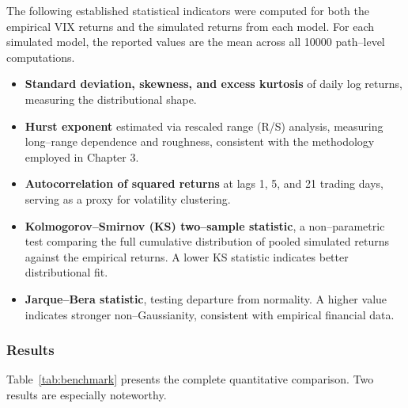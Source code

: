 \documentclass[12pt,a4paper]{report}
\numberwithin{equation}{section}
\begin{document}
The following established statistical indicators were computed for both the empirical VIX returns and the simulated returns from each model. For each simulated model, the reported values are the mean across all 10\hspace{1pt}000 path--level computations.

\begin{itemize}
\item \textbf{Standard deviation, skewness, and excess kurtosis} of daily log returns, measuring the distributional shape.
\item \textbf{Hurst exponent} estimated via rescaled range (R/S) analysis, measuring long--range dependence and roughness, consistent with the methodology employed in Chapter 3.
\item \textbf{Autocorrelation of squared returns} at lags 1, 5, and 21 trading days, serving as a proxy for volatility clustering.
\item \textbf{Kolmogorov--Smirnov (KS) two--sample statistic}, a non--parametric test comparing the full cumulative distribution of pooled simulated returns against the empirical returns. A lower KS statistic indicates better distributional fit.
\item \textbf{Jarque--Bera statistic}, testing departure from normality. A higher value indicates stronger non--Gaussianity, consistent with empirical financial data.
\end{itemize}

\subsubsection{Results}

Table~\ref{tab:benchmark} presents the complete quantitative comparison. Two results are especially noteworthy.
\end{document}

